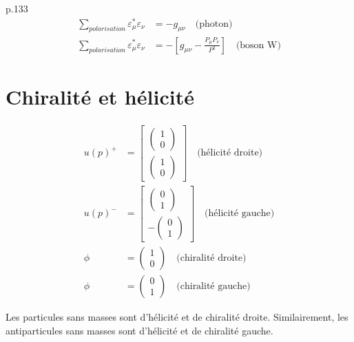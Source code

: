 \documentclass[12pt]{article}
\begin{document}
p.133 \\
\begin{align}
  \sum_{polarisation} \varepsilon_\mu^*\varepsilon_\nu &= - g_{\mu\nu} \quad \text{(photon)}\\
  \sum_{polarisation} \varepsilon_\mu^*\varepsilon_\nu &= - \left[g_{\mu\nu}- \frac{P_\mu P_\nu}{P^2}\right] \quad \text{(boson W)}
\end{align}

\section{Chiralité et hélicité}
\begin{align}
    u(p)^+ &= \begin{bmatrix}
      \begin{pmatrix}
          1\\ 0
      \end{pmatrix}\\
      \begin{pmatrix}
          1\\ 0
      \end{pmatrix}
    \end{bmatrix}
    \quad \text{(hélicité droite)}\\
    u(p)^- &= \begin{bmatrix}
      \begin{pmatrix}
          0\\1
      \end{pmatrix}\\
      -\begin{pmatrix}
          0\\1
      \end{pmatrix}
    \end{bmatrix}
    \quad \text{(hélicité gauche)}\\
    \phi &=
    \begin{pmatrix}
          1\\ 0
     \end{pmatrix}
     \quad \text{(chiralité droite)}\\
     \phi &=
    \begin{pmatrix}
          0\\1
      \end{pmatrix}
      \quad \text{(chiralité gauche)}
\end{align}

Les particules sans masses sont d'hélicité et de chiralité droite. Similairement, les antiparticules sans masses sont d'hélicité et de chiralité gauche.
\end{document}
